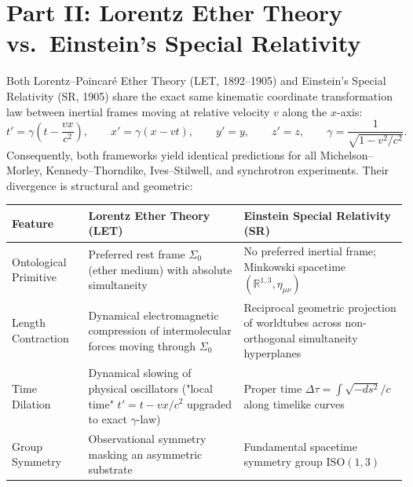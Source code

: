 \documentclass[11pt]{article}
\begin{document}
\section{Part II: Lorentz Ether Theory vs.\ Einstein's Special Relativity}
Both Lorentz--Poincar\'e Ether Theory (LET, 1892--1905) and Einstein's Special Relativity (SR, 1905) share the exact same kinematic coordinate transformation law between inertial frames moving at relative velocity $v$ along the $x$-axis:
\[
t' = \gamma\!\left(t - \frac{vx}{c^2}\right), \qquad x' = \gamma(x - vt), \qquad y' = y, \qquad z' = z, \qquad \gamma = \frac{1}{\sqrt{1 - v^2/c^2}}.
\]
Consequently, both frameworks yield identical predictions for all Michelson--Morley, Kennedy--Thorndike, Ives--Stilwell, and synchrotron experiments. Their divergence is structural and geometric:
\begin{center}
\begin{tabular}{p{3.4cm}p{5.5cm}p{5.5cm}}
\toprule
\textbf{Feature} & \textbf{Lorentz Ether Theory (LET)} & \textbf{Einstein Special Relativity (SR)} \\
\midrule
Ontological Primitive & Preferred rest frame $\Sigma_0$ (ether medium) with absolute simultaneity & No preferred inertial frame; Minkowski spacetime $(\mathbb{R}^{1,3},\eta_{\mu\nu})$ \\
Length Contraction & Dynamical electromagnetic compression of intermolecular forces moving through $\Sigma_0$ & Reciprocal geometric projection of worldtubes across non-orthogonal simultaneity hyperplanes \\
Time Dilation & Dynamical slowing of physical oscillators ("local time" $t' = t - vx/c^2$ upgraded to exact $\gamma$-law) & Proper time $\Delta\tau = \int \sqrt{-ds^2}/c$ along timelike curves \\
Group Symmetry & Observational symmetry masking an asymmetric substrate & Fundamental spacetime symmetry group $\mathrm{ISO}(1,3)$ \\
\bottomrule
\end{tabular}
\end{center}
\end{document}
